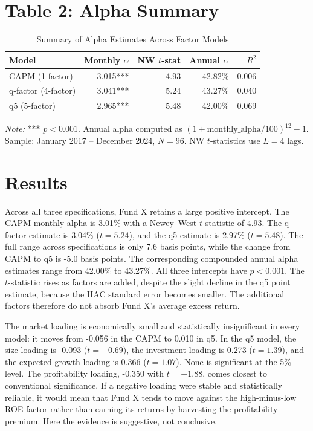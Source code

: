 \documentclass[11pt]{article}
\begin{document}
\clearpage
\section*{Table 2: Alpha Summary}
\begin{table}[H]
\centering
\caption{Summary of Alpha Estimates Across Factor Models}
\label{tab:alpha-summary}
\small
\begin{tabular}{lrrrr}
\toprule
Model & Monthly $\alpha$ & NW $t$-stat & Annual $\alpha$ & $R^2$ \\
\midrule
CAPM (1-factor) & 3.015*** & 4.93 & 42.82\% & 0.006 \\
q-factor (4-factor) & 3.041*** & 5.24 & 43.27\% & 0.040 \\
q5 (5-factor) & 2.965*** & 5.48 & 42.00\% & 0.069 \\
\bottomrule
\end{tabular}

\vspace{0.2cm}
\begin{minipage}{0.94\linewidth}
\footnotesize
\textit{Note:} *** $p<0.001$. Annual alpha computed as
$(1+\text{monthly\_alpha}/100)^{12}-1$. Sample: January 2017 -- December 2024,
$N=96$. NW $t$-statistics use $L=4$ lags.
\end{minipage}
\end{table}

\section*{Results}
Across all three specifications, Fund X retains a large positive intercept. The CAPM
monthly alpha is 3.01\% with a Newey--West $t$-statistic of
4.93. The q-factor estimate is 3.04\%
($t=5.24$), and the q5 estimate is 2.97\%
($t=5.48$). The full range across specifications is only
7.6 basis points, while the change from CAPM to q5 is
-5.0 basis points. The corresponding compounded annual alpha estimates
range from 42.00\% to 43.27\%. All three
intercepts have $p<0.001$. The $t$-statistic rises as factors are added, despite the
slight decline in the q5 point estimate, because the HAC standard error becomes smaller.
The additional factors therefore do not absorb Fund X's average excess return.

The market loading is economically small and statistically insignificant in every
model: it moves from -0.056 in the CAPM to
0.010 in q5. In the q5 model, the size loading is
-0.093 ($t=-0.69$), the investment
loading is 0.273 ($t=1.39$), and the
expected-growth loading is 0.366
($t=1.07$). None is significant at the 5\% level. The
profitability loading, -0.350 with
$t=-1.88$, comes closest to conventional significance. If a
negative loading were stable and statistically reliable, it would mean that Fund X
tends to move against the high-minus-low ROE factor rather than earning its returns by
harvesting the profitability premium. Here the evidence is suggestive, not conclusive.
\end{document}

